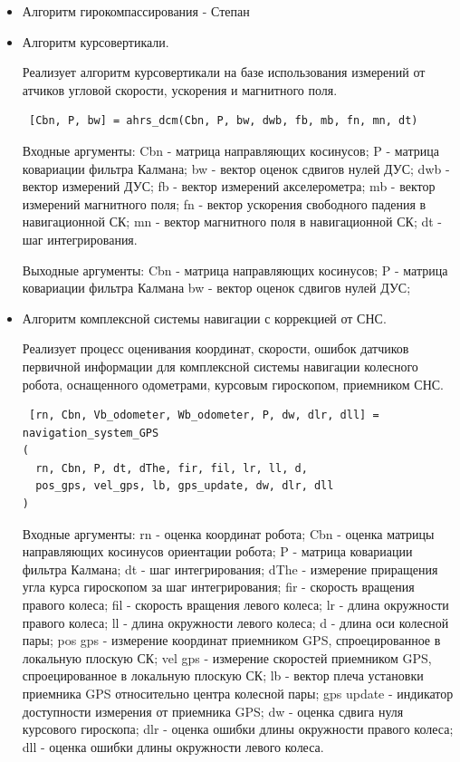 \documentclass[14pt]{article}
\begin{document}
\begin{itemize}
\item Алгоритм гирокомпассирования - Степан


\item Алгоритм курсовертикали.

Реализует алгоритм курсовертикали на базе использования измерений от атчиков угловой скорости, ускорения и магнитного поля.

\begin{verbatim} [Cbn, P, bw] = ahrs_dcm(Cbn, P, bw, dwb, fb, mb, fn, mn, dt) \end{verbatim}

 Входные аргументы: Cbn - матрица направляющих косинусов;  P   - матрица ковариации фильтра Калмана;  bw  - вектор оценок сдвигов нулей ДУС; dwb - вектор измерений ДУС;
fb  - вектор измерений акселерометра; mb  - вектор измерений магнитного поля; fn  - вектор ускорения свободного падения в навигационной СК; mn  - вектор магнитного поля в навигационной СК;
dt  - шаг интегрирования.

Выходные аргументы: Cbn  - матрица направляющих косинусов; P    - матрица ковариации фильтра Калмана bw   - вектор оценок сдвигов нулей ДУС;

\item Алгоритм комплексной системы навигации с коррекцией от СНС.

Реализует процесс оценивания координат, скорости, ошибок датчиков первичной информации для комплексной системы навигации колесного робота, оснащенного одометрами, курсовым гироскопом, приемником СНС.

\begin{verbatim} [rn, Cbn, Vb_odometer, Wb_odometer, P, dw, dlr, dll] = 
navigation_system_GPS
(
  rn, Cbn, P, dt, dThe, fir, fil, lr, ll, d,
  pos_gps, vel_gps, lb, gps_update, dw, dlr, dll
)
 \end{verbatim}
 
 Входные аргументы:  rn - оценка координат робота; Cbn - оценка матрицы направляющих косинусов ориентации робота; P - матрица ковариации фильтра Калмана; dt - шаг интегрирования;
 dThe - измерение приращения угла курса гироскопом за шаг интегрирования; fir - скорость вращения правого колеса; fil - скорость вращения левого колеса; lr - длина окружности правого колеса; 
 ll - длина окружности левого колеса; d - длина оси колесной пары; pos gps - измерение координат приемником GPS, спроецированное в локальную плоскую СК; vel gps - измерение скоростей приемником GPS, спроецированное в локальную плоскую СК; lb - вектор плеча установки приемника GPS относительно центра колесной пары; gps update - индикатор доступности измерения от приемника GPS; 
 dw - оценка сдвига нуля курсового гироскопа; dlr - оценка ошибки длины окружности правого колеса; dll - оценка ошибки длины окружности левого колеса.
 

\end{itemize}
\end{document}
